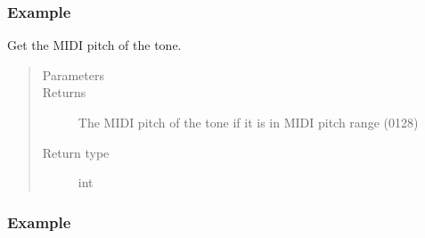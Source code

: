 \documentclass[letterpaper,10pt,english]{sphinxmanual}
\begin{document}
\begin{fulllineitems}
\begin{fulllineitems}
\subsubsection*{Example}

\begin{sphinxVerbatim}[commandchars=\\\{\}]
  
  
 
\end{sphinxVerbatim}

\end{fulllineitems}


\begin{fulllineitems}
\label{\detokenize{api:main.Tone.get_midi_pitch}}
Get the MIDI pitch of the tone.
\begin{quote}\begin{description}
\item[{Parameters}] \leavevmode
{} \textendash{} 

\item[{Returns}] \leavevmode
The MIDI pitch of the tone if it is in MIDI pitch range (0\textendash{}128)

\item[{Return type}] \leavevmode
int

\end{description}\end{quote}
\subsubsection*{Example}

\begin{sphinxVerbatim}[commandchars=\\\{\}]
  
\end{sphinxVerbatim}


\end{fulllineitems}
\end{fulllineitems}
\end{document}
